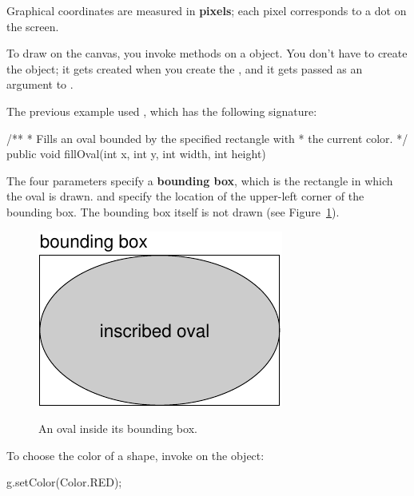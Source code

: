 
Graphical coordinates are measured in {\bf pixels}; each pixel corresponds to a dot on the screen.

To draw on the canvas, you invoke methods on a  object.
You don't have to create the  object; it gets created when you create the , and it gets passed as an argument to .

The previous example used , which has the following signature:

\begin{code}
/**
 * Fills an oval bounded by the specified rectangle with
 * the current color.
 */
public void fillOval(int x, int y, int width, int height)
\end{code}


The four parameters specify a {\bf bounding box}, which is the rectangle in which the oval is drawn.
 and  specify the location of the upper-left corner of the bounding box.
The bounding box itself is not drawn (see Figure~\ref{fig.circle}).

\begin{figure}[!ht]
\begin{center}
\includegraphics[alt={Diagram showing an oval shape drawn inside a rectangular bounding box, with the bounding box coordinates labeled but not visible in the final drawing}]{figs/circle.pdf}
\caption{An oval inside its bounding box.}
\label{fig.circle}
\end{center}
\end{figure}


To choose the color of a shape, invoke  on the  object:

\begin{code}
g.setColor(Color.RED);
\end{code}

